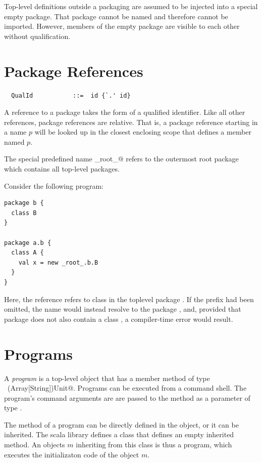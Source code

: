 Top-level definitions outside a packaging are assumed to be injected
into a special empty package. That package cannot be named and
therefore cannot be imported. However, members of the empty package
are visible to each other without qualification.

\section{Package References}

\syntax\begin{lstlisting}
  QualId           ::=  id {`.' id}
\end{lstlisting}
A reference to a package takes the form of a qualified identifier.
Like all other references, package references are relative. That is, 
a package reference starting in a name $p$ will be looked up in the
closest enclosing scope that defines a member named $p$.

The special predefined name \lstinline@_root_@  refers to the
outermost root package which contains all top-level packages.  

\example\label{ex:package-ids}
Consider the following program:
\begin{lstlisting}
package b {
  class B 
}

package a.b {
  class A {
    val x = new _root_.b.B
  }
}
\end{lstlisting}  
Here, the reference  refers to class  in the
toplevel package . If the  prefix had been
omitted, the name  would instead resolve to the package
, and, provided that package does not also
contain a class , a compiler-time error would result.

\section{Programs}

A {\em program} is a top-level object that has a member method
 of type ~\lstinline@(Array[String])Unit@. Programs can be
executed from a command shell. The program's command arguments are are
passed to the  method as a parameter of type
.

The  method of a program can be directly defined in the
object, or it can be inherited. The scala library defines a class
 that defines an empty inherited  method.
An objects $m$ inheriting from this class is thus a program, 
which executes the initializaton code of the object $m$.

